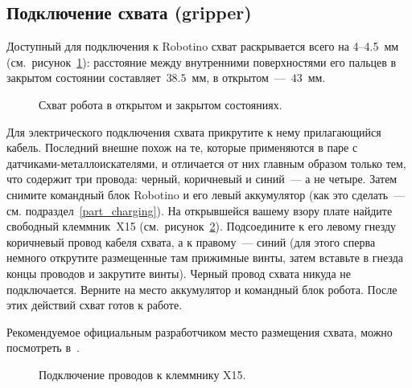 \subsection{Подключение схвата (gripper)}\label{part_gripper_connect}
Доступный для подключения к Robotino схват раскрывается всего на 4--4.5~мм (см.~рисунок~\ref{img_gripper_op_cl}): расстояние между внутренними поверхностями его пальцев в закрытом состоянии составляет~$38.5$~мм, в открытом~---~$43$~мм.

\begin{figure}[h]
	\begin{minipage}[h]{0.49\linewidth}
	\end{minipage}
	\hfill
	\begin{minipage}[h]{0.49\linewidth}
	\end{minipage}
	\caption{Схват робота в открытом и закрытом состояниях.}
	\label{img_gripper_op_cl}
\end{figure}

Для электрического подключения схвата прикрутите к нему прилагающийся кабель.
Последний внешне похож на те, которые применяются в паре с датчиками-металлоискателями, и отличается от них главным образом только тем, что содержит три провода: черный, коричневый и синий~--- а не четыре.
Затем снимите командный блок Robotino и его левый аккумулятор (как это сделать~--- см. подраздел~\ref{part_charging}).
На открывшейся вашему взору плате найдите свободный клеммник~X15 (см.~рисунок~\ref{img_x15}).
Подсоедините к его левому гнезду коричневый провод кабеля схвата, а к правому~--- синий (для этого сперва немного открутите размещенные там прижимные винты, затем вставьте в гнезда концы проводов и закрутите винты).
Черный провод схвата никуда не подключается.
Верните на место аккумулятор и командный блок робота.
После этих действий схват готов к работе.

Рекомендуемое официальным разработчиком место размещения схвата, можно посмотреть в~\cite{gripper_manual}.

\begin{figure}[h]
	\begin{minipage}[h]{0.65\linewidth}
	\end{minipage}
	\hfill
	\begin{minipage}[h]{0.33\linewidth}
	\end{minipage}
	\caption{Подключение проводов к клеммнику X15.}
	\label{img_x15}
\end{figure}

